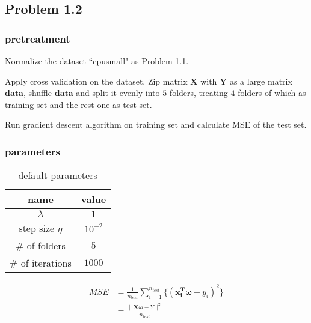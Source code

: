 \documentclass[a4paper,11pt]{article}
\begin{document}
\subsection*{Problem 1.2}
\subsubsection*{pretreatment}
Normalize the dataset ``cpusmall" as Problem 1.1.\par
Apply cross validation on the dataset. Zip matrix $\bm{X}$ with $\bm{Y}$ as a large matrix $\bm{data}$, shuffle $\bm{data}$ and split it evenly into $5$ folders, treating $4$ folders of which as training set and the rest one as test set.\par
Run gradient descent algorithm on training set and calculate MSE of the test set.\par
\subsubsection*{parameters}
\begin{table}[H]
	\begin{center}
		\caption{default parameters}
		\begin{tabular}{cc}
			\toprule[2pt]
			name &	value  \\ 
			\hline 
			$\lambda$ &	$1$  \\ 
			step size $\eta$ & $10^{-2}$  \\ 
			$\#$ of folders & $5$  \\ 
			$\#$ of iterations& $1000$\\
			\bottomrule[2pt]
		\end{tabular} 
	\end{center}
\end{table}
\par
\begin{equation}
	\begin{aligned}
		MSE&=\frac{1}{n_{test}}\sum_{i=1}^{n_{test}}\{(\bm{x_{i}^{T}}\bm{\omega}-y_{i})^{2}\}\\
		&=\frac{\|\bm{X}\bm{\omega}-Y\|^2}{n_{test}}
	\end{aligned}
\end{equation}
\par
\end{document}
